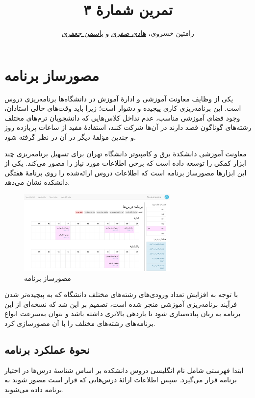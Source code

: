 \documentclass{utap}
\title{تمرین شمارهٔ ۳}
\author{رامتین خسروی، \href{mailto:hadi.safari@ut.ac.ir?subject=[AP\%20S98 A3]\%20}{هادی صفری} و \href{mailto:ys.jafari@ut.ac.ir?subject=[AP\%20S98 A3]\%20}{یاسمن جعفری}}
\begin{document}
    \maketitle

    \section{مصورساز برنامه}

    یکی از وظایف معاونت آموزشی و ادارهٔ آموزش در دانشگاه‌ها برنامه‌ریزی دروس است. این برنامه‌ریزی کاری پیچیده و دشوار است؛ زیرا باید وقت‌های خالی استادان، وجود فضای آموزشی مناسب، عدم تداخل کلاس‌هایی که دانشجویان ترم‌های مختلف رشته‌های گوناگون قصد دارند در آن‌ها شرکت کنند، استفادهٔ مفید از ساعات پربازده روز و چندین مؤلفهٔ دیگر در آن در نظر گرفته شود.

    معاونت آموزشی دانشکدهٔ برق و کامپیوتر دانشگاه تهران برای تسهیل برنامه‌ریزی چند ابزار کمکی را توسعه داده است که برخی اطلاعات مورد نیاز را مصور می‌کند. یکی از این ابزارها مصورساز برنامه است که اطلاعات دروس ارائه‌شده را روی برنامهٔ هفتگی دانشکده نشان می‌دهد.

    \begin{figure}[hb]
        \centering
        \includegraphics[width=0.7\textwidth]{webversion.png}
        \caption{مصورساز برنامه}
    \end{figure}

    با توجه به افزایش تعداد ورودی‌های رشته‌های مختلف دانشگاه که به پیچیده‌تر شدن فرآیند برنامه‌ریزی آموزشی منجر شده است، تصمیم بر این شد که نسخه‌ای از این برنامه به زبان  پیاده‌سازی شود تا بازدهی بالاتری داشته باشد و بتوان به‌سرعت انواع برنامه‌های رشته‌های مختلف را با آن مصورسازی کرد.

    \subsection{نحوهٔ عملکرد برنامه}

    ابتدا فهرستی شامل نام انگلیسی دروس دانشکده بر اساس شناسهٔ درس‌ها در اختیار برنامه قرار می‌گیرد. سپس اطلاعات ارائهٔ درس‌هایی که قرار است مصور شوند به برنامه داده می‌شوند.
\end{document}
